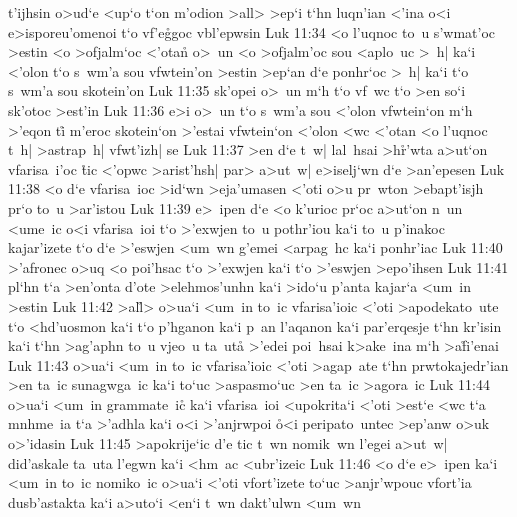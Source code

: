 t'ijhsin
o>ud`e
<up`o
t`on
m'odion
>all>
>ep`i
t`hn
luqn'ian
<'ina
o<i
e>isporeu'omenoi
t`o
vf'e\r{g}goc
vbl'epwsin\bibvsend
\vs Luk 11:34
<o
l'uqnoc
to~u
s'wmat'oc
>estin
<o
>ofjalm`oc
<'otan\r{}
o>~un
<o
>ofjalm'oc
sou
<aplo~uc
>~h|
ka`i
<'olon
t`o
s~wm'a
sou
vfwtein'on
>estin
>ep`an
d`e
ponhr`oc
>~h|
ka`i
t`o
s~wm'a
sou
skotein'on\bibvsend
\vs Luk 11:35
sk'opei
o>~un
m`h
t`o
vf~wc
t`o
>en
so`i
sk'otoc
>est'in\bibvsend
\vs Luk 11:36
e>i
o>~un
t`o
s~wm'a
sou
<'olon
vfwtein`on
m`h
>'eqon
ti\r{}
m'eroc
skotein`on
>'estai
vfwtein`on
<'olon
<wc
<'otan
<o
l'uqnoc
t~h|
>astrap~h|
vfwt'izh|
se\bibvsend
\vs Luk 11:37
>en
d`e
t~w|
lal~hsai
>h\r{r}'wta
a>ut`on
vfarisa~i'oc
\r{t}ic
<'opwc
>arist'hsh|
par>
a>ut~w|
e>iselj`wn
d`e
>an'epesen\bibvsend
\vs Luk 11:38
<o
d`e
vfarisa~ioc
>id`wn
>eja'umasen
<'oti
o>u
pr~wton
>ebapt'isjh
pr`o
to~u
>ar'istou\bibvsend
\vs Luk 11:39
e>~ipen
d`e
<o
k'urioc
pr`oc
a>ut`on
n~un
<ume~ic
o<i
vfarisa~ioi
t`o
>'exwjen
to~u
pothr'iou
ka`i
to~u
p'inakoc
kajar'izete
t`o
d`e
>'eswjen
<um~wn
g'emei
<arpag~hc
ka`i
ponhr'iac\bibvsend
\vs Luk 11:40
>'afronec
o>uq
<o
poi'hsac
t`o
>'exwjen
ka`i
t`o
>'eswjen
>epo'ihsen\bibvsend
\vs Luk 11:41
pl`hn
t`a
>en'onta
d'ote
>elehmos'unhn
ka`i
>ido`u
p'anta
kajar`a
<um~in
>estin\bibvsend
\vs Luk 11:42
>al\r{l}>
o>ua`i
<um~in
to~ic
vfarisa'ioic
<'oti
>apodekato~ute
t`o
<hd'uosmon
ka`i
t`o
p'hganon
ka`i
p~an
l'aqanon
ka`i
par'erqesje
t`hn
kr'isin
ka`i
t`hn
>ag'aphn
to~u
vjeo~u
ta~ut\r{a}
>'edei
poi~hsai
k>ake~ina
m`h
>a\r{f}i'enai\bibvsend
{}
\vs Luk 11:43
o>ua`i
<um~in
to~ic
vfarisa'ioic
<'oti
>agap~ate
t`hn
prwtokajedr'ian
>en
ta~ic
sunagwga~ic
ka`i
to`uc
>aspasmo`uc
>en
ta~ic
>agora~ic\bibvsend
\vs Luk 11:44
o>ua`i
<um~in
grammate~ic\r{}
ka`i
vfarisa~ioi
<upokrita`i
<'oti
>est`e
<wc
t`a
mnhme~ia
t`a
>'adhla
ka`i
o<i
>'anjrwpoi
\r{o}<i
peripato~untec
>ep'anw
o>uk
o>'idasin\bibvsend
\vs Luk 11:45
>apokrije`ic
d'e
tic
t~wn
nomik~wn
l'egei
a>ut~w|
did'askale
ta~uta
l'egwn
ka`i
<hm~ac
<ubr'izeic\bibvsend
\vs Luk 11:46
<o
d`e
e>~ipen
ka`i
<um~in
to~ic
nomiko~ic
o>ua`i
<'oti
vfort'izete
to`uc
>anjr'wpouc
vfort'ia
dusb'astakta
ka`i
a>uto`i
<en`i
t~wn
dakt'ulwn
<um~wn

